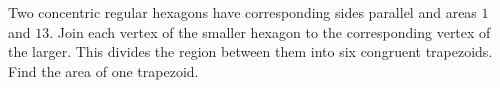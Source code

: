 Two concentric regular hexagons have corresponding sides parallel and areas $1$ and $13$. Join each vertex of the smaller hexagon to the corresponding vertex of the larger. This divides the region between them into six congruent trapezoids. Find the area of one trapezoid.
